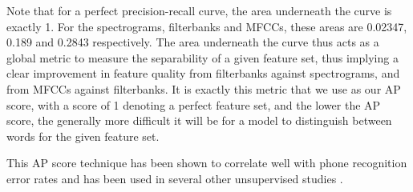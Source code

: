 Note that for a perfect precision-recall curve, the area underneath the curve is exactly 1.
For the spectrograms, filterbanks and MFCCs, these areas are 0.02347, 0.189 and 0.2843 respectively.
The area underneath the curve thus acts as a global metric to measure the separability of a given feature set, thus implying a clear improvement in feature quality from filterbanks against spectrograms, and from MFCCs against filterbanks.
It is exactly this metric that we use as our AP score, with a score of 1 denoting a perfect feature set, and the lower the AP score, the generally more difficult it will be for a model to distinguish between words for the given feature set.

This AP score technique has been shown to correlate well with phone recognition error rates \cite{DBLP:conf/interspeech/CarlinTJH11} and has been used in several other unsupervised studies \cite{kamper_elsner_jansen_goldwater_2015}.